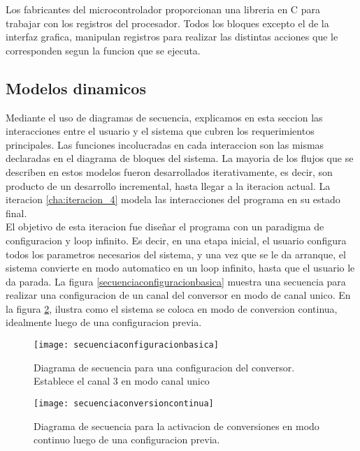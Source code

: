 
Los fabricantes del microcontrolador proporcionan una libreria en C para trabajar con los registros del procesador. Todos los bloques excepto el de la interfaz grafica, manipulan registros para realizar las distintas acciones que le corresponden segun la funcion que se ejecuta.  


\subsection{Modelos dinamicos} %
\label{sub:modelos_dinamicos}

Mediante el uso de diagramas de secuencia, explicamos en esta seccion las interacciones entre el usuario y el sistema que cubren los requerimientos principales. Las funciones incolucradas en cada interaccion son las mismas declaradas en el diagrama de bloques del sistema. La mayoria de los flujos que se describen en estos modelos fueron desarrollados iterativamente, es decir, son producto de un desarrollo incremental, hasta llegar a la iteracion actual. La iteracion \ref{cha:iteracion_4} modela las interacciones del programa en su estado final. \\

El objetivo de esta iteracion fue diseñar el programa con un paradigma de configuracion y loop infinito. Es decir, en una etapa inicial, el usuario configura todos los parametros necesarios del sistema, y una vez que se le da arranque, el sistema convierte en modo automatico en un loop infinito, hasta que el usuario le da parada. La figura \ref{secuenciaconfiguracionbasica} muestra una secuencia para realizar una configuracion de un canal del conversor en modo de canal unico. En la figura \ref{fig:secuenciaconversioncontinua}, ilustra como el sistema se coloca en modo de conversion continua, idealmente luego de una configuracion previa. 

\begin{figure}[h]
  \centering
  \texttt{[image: secuenciaconfiguracionbasica]}
  \caption{Diagrama de secuencia para una configuracion del conversor. Establece el canal 3 en modo canal unico}\label{fig:secuenciaconfiguracionbasica}
\end{figure}

\begin{figure}[h]
  \centering
  \texttt{[image: secuenciaconversioncontinua]}
  \caption{Diagrama de secuencia para la activacion de conversiones en modo continuo luego de una configuracion previa.}\label{fig:secuenciaconversioncontinua}
\end{figure}


